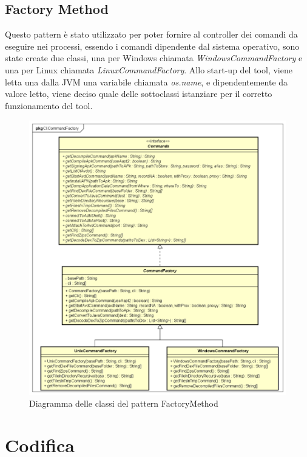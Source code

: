 \subsection*{Factory Method}\label{subsec:factory-method}
Questo pattern è stato utilizzato per poter fornire al controller dei comandi da eseguire nei processi, essendo i comandi dipendente dal sistema operativo, sono state create due classi, una per Windows chiamata \textit{WindowsCommandFactory} e una per Linux chiamata \textit{LinuxCommandFactory}.
Allo start-up del tool, viene letta una dalla JVM una variabile chiamata \textit{os.name}, e dipendentemente da valore letto, viene deciso quale delle sottoclassi istanziare per il corretto funzionamento del tool.
\begin{figure}[H]
    \centering
    \includegraphics[width=14cm, height=12cm]{./immagini/diagrammi_uml/CommandFactory.png}
    \caption{Diagramma delle classi del pattern FactoryMethod}\label{fig:factory-method}
\end{figure}
\section{Codifica}\label{sec:codifica}
